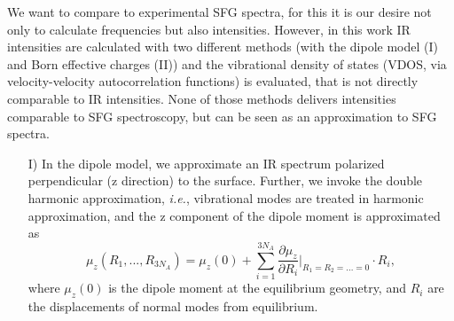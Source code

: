\documentclass[11pt,DIV=13,BCOR=5mm,a4paper,headinclude]{scrbook}
\begin{document}
We want to compare to experimental SFG spectra, for this it is our desire not only to calculate frequencies but also intensities.
However, in this work IR intensities are calculated with two different methods (with the dipole model (I) and Born effective charges (II)) and the vibrational density of states (VDOS, via velocity-velocity autocorrelation functions) is evaluated, that is not directly comparable to IR intensities.
None of those methods delivers intensities comparable to SFG spectroscopy, but can be seen as an approximation to SFG spectra.


\begin{itemize}
 \item[I)]
 In the dipole model, we approximate an IR spectrum polarized perpendicular (z direction) to the surface.
 Further, we invoke the double harmonic approximation, \textit{i.e.}, vibrational modes are treated in harmonic approximation, and the z component of the dipole moment is approximated as
 \begin{equation}
  \mu_z(R_1,...,R_{3N_A})=\mu_z(0) + \sum_{i=1}^{3N_A}\frac{\partial \mu_z}{\partial R_i}|_{R_1=R_2=...=0}\cdot R_i ,
 \end{equation}
 where $\mu_z(0)$ is the dipole moment at the equilibrium geometry, and $R_i$ are the displacements of normal modes from equilibrium.
 

\end{itemize}
\end{document}

